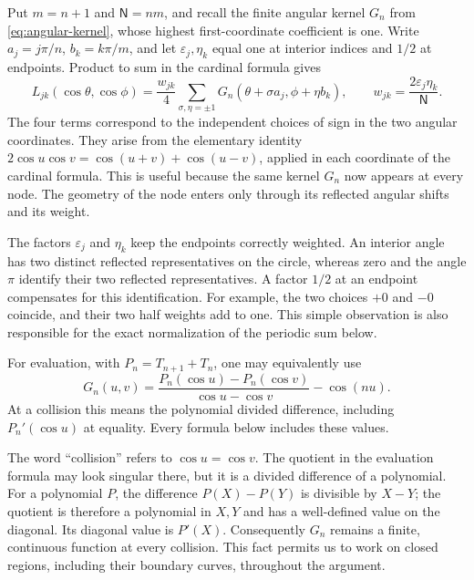 Put $m=n+1$ and $\mathsf N=nm$, and recall the finite angular kernel
$G_n$ from \eqref{eq:angular-kernel}, whose highest first-coordinate
coefficient is one.  Write
$a_j=j\pi/n$, $b_k=k\pi/m$, and let $\varepsilon_j,\eta_k$ equal one at interior
indices and $1/2$ at endpoints.  Product to sum in the cardinal formula gives
\begin{equation}\label{ul:cardinal-reflection}
 L_{jk}(\cos\theta,\cos\phi)=\frac{w_{jk}}4
   \sum_{\sigma,\eta=\pm1}G_n(\theta+\sigma a_j,\phi+\eta b_k),
 \qquad w_{jk}=\frac{2\varepsilon_j\eta_k}{\mathsf N}.
\end{equation}
The four terms correspond to the independent choices of sign in the
two angular coordinates.  They arise from the elementary identity
$2\cos u\cos v=\cos(u+v)+\cos(u-v)$, applied in each coordinate
of the cardinal formula.  This is useful because the same kernel
$G_n$ now appears at every node.  The geometry of the node enters only
through its reflected angular shifts and its weight.

The factors $\varepsilon_j$ and $\eta_k$ keep the endpoints correctly weighted.
An interior angle has two distinct reflected representatives on the
circle, whereas zero and the angle $\pi$ identify their two reflected
representatives.  A factor $1/2$ at an endpoint compensates for this
identification.  For example, the two choices $+0$ and $-0$ coincide,
and their two half weights add to one.  This simple observation is also
responsible for the exact normalization of the periodic sum below.

For evaluation, with $P_n=T_{n+1}+T_n$, one may equivalently use
\begin{equation}\label{eq:kernel-evaluation}
 G_n(u,v)=\frac{P_n(\cos u)-P_n(\cos v)}{\cos u-\cos v}-\cos(nu).
\end{equation}
At a collision this means the polynomial divided difference, including
$P_n'(\cos u)$ at equality.  Every formula below includes these values.

The word ``collision'' refers to $\cos u=\cos v$.  The quotient in
the evaluation formula may look singular there, but it is a divided
difference of a polynomial.  For a polynomial $P$, the difference
$P(X)-P(Y)$ is divisible by $X-Y$; the quotient is therefore a
polynomial in $X,Y$ and has a well-defined value on the diagonal.
Its diagonal value is $P'(X)$.  Consequently $G_n$ remains a finite,
continuous function at every collision.  This fact permits us to work
on closed regions, including their boundary curves, throughout the
argument.

